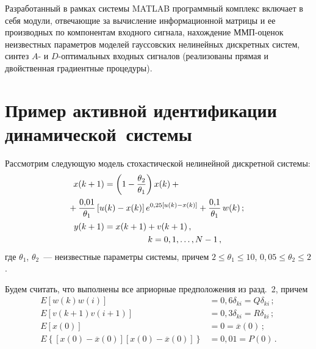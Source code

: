 \begin{multicols}{2}
     Разработанный в рамках системы MATLAB программный комплекс
включает в себя модули, отвечающие за вычисление информационной матрицы
и ее производных по компонентам входного сигнала, нахождение
     ММП-оце\-нок неизвестных параметров моделей гауссовских
нелинейных дискретных систем, синтез $A$- и $D$-оп\-ти\-маль\-ных входных
сигналов (реализованы прямая и двойственная градиентные процедуры).

\section{Пример активной идентификации динамической~системы}

  Рассмотрим следующую модель стохастической нелинейной дискретной
системы:
  \begin{align}
  x(k+1) &=\left(1-\fr{\theta_2}{\theta_1}\right) x(k)+{}\notag\\
&\hspace*{-15mm}  {}+\fr{0{,}01}{\theta_1}\left[
u(k)-x(k)\right] e^{0{,}25[u(k)-x(k)]}+\fr{0{,}1}{\theta_1}\,w(k)\,;\label{e20-c}\\
  y(k+1) &= x(k+1)+v(k+1)\,, \notag\\
  &\hspace*{18mm}k=0,1,\ldots , N-1\,,
  \label{e21-c}
  \end{align}
где $\theta_1$, $\theta_2$~--- неизвестные параметры системы, причем $2\leq
\theta_1\leq 10$, $0{,}05\leq \theta_2\leq 2$.

  Будем считать, что выполнены все априорные предположения из разд.~2,
причем
  \begin{align*}
  E\left[ w(k) w(i)\right] & = 0{,}6\delta_{ki}=Q\delta_{ki}\,;\\
  E\left[ v(k+1) v(i+1)\right] &=0{,}3\delta_{ki}=R\delta_{ki}\,;\\
  E\left[x(0)\right] &=0=\overline{x}(0)\,;\\
  E\left\{\left[ x(0)-\overline{x}(0)\right]\left[ x(0)-
\overline{x}(0)\right]\right\}&=0{,}01=P(0)\,.
  \end{align*}


\end{multicols}
